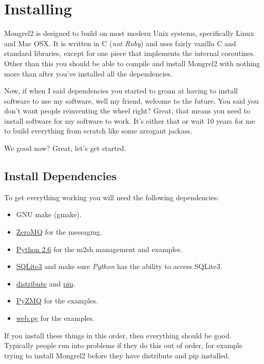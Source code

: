 \chapter{Installing}

Mongrel2 is designed to build on most modern Unix systems, specifically Linux
and Mac OSX.  It is written in C (\emph{not Ruby}) and uses fairly vanilla
C and standard libraries, except for one piece that implements the internal
coroutines.  Other than this you should be able to compile and install Mongrel2
with nothing more than  after you've installed
all the dependencies.

Now, if when I said dependencies you started to groan at having to install
software to use my software, well my friend, welcome to the future.  You
said you don't want people reinventing the wheel right?  Great, that means
you need to install software for my software to work.  It's either that or
wait 10 years for me to build everything from scratch like some arrogant
jackass.

We good now?  Great, let's get started.

\section{Install Dependencies}

To get everything working you will need the following dependencies:

\begin{itemize}
\item GNU make (gmake).
\item \href{http://zeromq.org}{ZeroMQ} for the messaging.
\item \href{http://python.org}{Python 2.6} for the m2sh management and examples.
\item \href{http://www.sqlite.org/}{SQLite3} and make sure \emph{Python} has the ability to access SQLite3.
\item \href{http://pypi.python.org/pypi/distribute}{distribute} and \href{http://pypi.python.org/pypi/pip/0.7.2}{pip}.
\item \href{http://github.com/zeromq/pyzmq}{PyZMQ} for the examples.
\item \href{http://webpy.org/}{web.py} for the examples.
\end{itemize}

If you install these things in this order, then everything should be good.
Typically people run into problems if they do this out of order, for example
trying to install Mongrel2 before they have distribute and pip installed.

